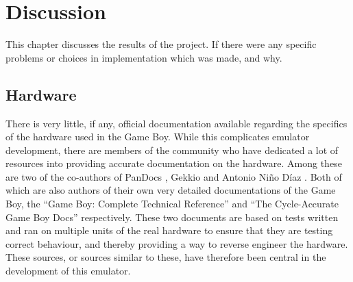 \chapter{Discussion}
This chapter discusses the results of the project. If there were any specific problems or choices in implementation which was made, and why.

\section{Hardware}
There is very little, if any, official documentation available regarding the specifics of the hardware used in the Game Boy. While this complicates emulator development, there are members of the community who have dedicated a lot of resources into providing accurate documentation on the hardware. Among these are two of the co-authors of PanDocs \cite{pandocs}, Gekkio \cite{Gekkio.fi} and Antonio Niño Díaz \cite{AntonioND}. Both of which are also authors of their own very detailed documentations of the Game Boy, the ``Game Boy: Complete Technical Reference'' \cite{CompleteTechnicalReference} and ``The Cycle-Accurate Game Boy Docs'' \cite{TCAGBD} respectively. These two documents are based on tests written and ran on multiple units of the real hardware to ensure that they are testing correct behaviour, and thereby providing a way to reverse engineer the hardware. These sources, or sources similar to these, have therefore been central in the development of this emulator.

